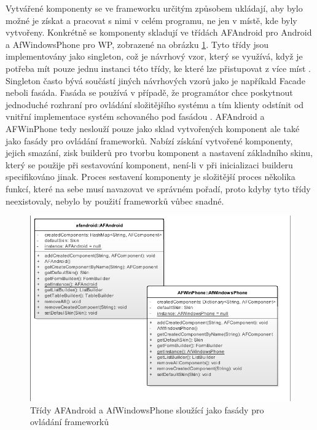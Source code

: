 Vytvářené komponenty se ve frameworku určitým způsobem ukládají, aby bylo možné je získat a pracovat s nimi v celém programu, ne jen v místě, kde byly vytvořeny. Konkrétně se komponenty skladují ve třídách AFAndroid pro Android a AfWindowsPhone pro WP, zobrazené na obrázku \ref{img:facades}. Tyto třídy jsou implementovány jako singleton, což je návrhový vzor, který se využívá, když je potřeba mít pouze jednu instanci této třídy, ke které lze přistupovat z více míst \cite{gamma}. Singleton často bývá součástí jiných návrhových vzorů jako je napříkald Facade neboli fasáda. Fasáda se používá v případě, že programátor chce poskytnout jednoduché rozhraní pro ovládání složitějšího systému a tím klienty odstínit od vnitřní implementace systém schovaného pod fasádou \cite{gamma}. AFAndroid a AFWinPhone tedy neslouží pouze jako sklad vytvořených komponent ale také jako fasády pro ovládání frameworků. Nabízí získání vytvořené komponenty, jejich smazání, zisk builderů pro tvorbu komponent a nastavení základního skinu, který se použije při sestavování komponent, není-li v při inicializaci builderu specifikováno jinak. Proces sestavení komponenty je složitější proces několika funkcí, které na sebe musí navazovat ve správném pořadí, proto kdyby tyto třídy neexistovaly, nebylo by použití frameworků vůbec snadné.

\begin{figure}[h!]
\centering
\includegraphics[width=0.8\linewidth, trim=4 4 4 4, clip]{figures/facades}
\caption{Třídy AFAndroid a AfWindowsPhone sloužící jako fasády pro ovládání frameworků}
\label{img:facades}
\end{figure}

